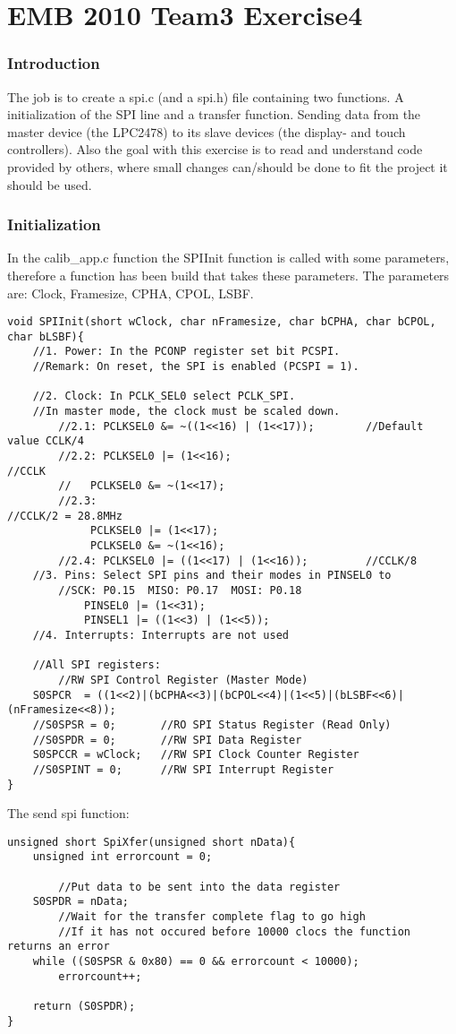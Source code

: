 

\part*{EMB 2010 Team3 Exercise4}
\section{Introduction}
The job is to create a spi.c (and a spi.h) file containing two functions. A initialization of the SPI line and a transfer function.
Sending data from the master device (the LPC2478) to its slave devices (the display- and touch controllers). 
Also the goal with this exercise is to read and understand code provided by others, where small changes can/should be done to
fit the project it should be used.
\section{Initialization}
In the calib\_app.c function the SPIInit function is called with some parameters, therefore a function has been build that takes these parameters. The parameters are: Clock, Framesize, CPHA, CPOL, LSBF.

\begin{lstlisting}
void SPIInit(short wClock, char nFramesize, char bCPHA, char bCPOL, char bLSBF){
	//1. Power: In the PCONP register set bit PCSPI.
	//Remark: On reset, the SPI is enabled (PCSPI = 1).

	//2. Clock: In PCLK_SEL0 select PCLK_SPI.
	//In master mode, the clock must be scaled down.
		//2.1: PCLKSEL0 &= ~((1<<16) | (1<<17));		//Default value CCLK/4
		//2.2: PCLKSEL0 |= (1<<16);									//CCLK
		//   PCLKSEL0 &= ~(1<<17);
		//2.3:																			//CCLK/2 = 28.8MHz
			 PCLKSEL0 |= (1<<17);
			 PCLKSEL0 &= ~(1<<16);
		//2.4: PCLKSEL0 |= ((1<<17) | (1<<16)); 		//CCLK/8
	//3. Pins: Select SPI pins and their modes in PINSEL0 to
		//SCK: P0.15  MISO: P0.17  MOSI: P0.18
			PINSEL0 |= (1<<31);
			PINSEL1 |= ((1<<3) | (1<<5));
	//4. Interrupts: Interrupts are not used

	//All SPI registers:
		//RW SPI Control Register (Master Mode)
	S0SPCR	= ((1<<2)|(bCPHA<<3)|(bCPOL<<4)|(1<<5)|(bLSBF<<6)|(nFramesize<<8));
	//S0SPSR = 0;		//RO SPI Status Register (Read Only)
	//S0SPDR = 0;		//RW SPI Data Register
	S0SPCCR = wClock;	//RW SPI Clock Counter Register
	//S0SPINT = 0;		//RW SPI Interrupt Register
}
\end{lstlisting}

The send spi function:
\begin{lstlisting}
unsigned short SpiXfer(unsigned short nData){
	unsigned int errorcount = 0;

		//Put data to be sent into the data register
	S0SPDR = nData;
		//Wait for the transfer complete flag to go high
		//If it has not occured before 10000 clocs the function returns an error
	while ((S0SPSR & 0x80) == 0 && errorcount < 10000);
		errorcount++;

	return (S0SPDR);
}

\end{lstlisting}

